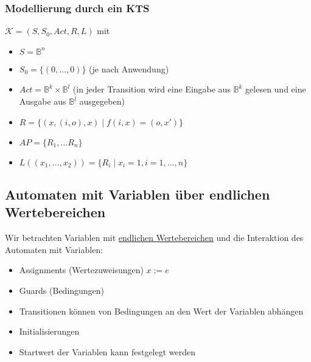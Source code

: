 \subsubsection*{Modellierung durch ein KTS}
$\mathcal{K} = (S, S_0, \textit{Act}, R, L)$ mit
\begin{itemize}
	\item $S = \mathbb{B}^n$
	\item $S_0 = \{(0, \dots, 0)\}$ (je nach Anwendung)
	\item $\textit{Act} = \mathbb{B}^k \times \mathbb{B}^l$ (in jeder Transition wird eine Eingabe aus $\mathbb{B}^k$ gelesen und eine Ausgabe aus $\mathbb{B}^l$ ausgegeben)
	\item $R = \{(x, (i,o), x) \mid f(i,x) = (o, x')\}$
	\item $AP = \{R_1, \dots R_n\}$
	\item $L\left((x_1,\dots,x_2)\right) = \{R_i \mid x_i = 1, i=1,\dots,n\}$
\end{itemize}

\subsection{Automaten mit Variablen über endlichen Wertebereichen}
\begin{center}
\end{center}

Wir betrachten Variablen mit \underline{endlichen Wertebereichen} und die Interaktion des Automaten mit Variablen:
\begin{itemize}
	\item Assignments (Wertezuweisungen) \hspace{5mm} $x := e$
	\item Guards (Bedingungen)
	\item[] Transitionen können von Bedingungen an den Wert der Variablen abhängen
	\item Initialisierungen
	\item[] Startwert der Variablen kann festgelegt werden
\end{itemize}

